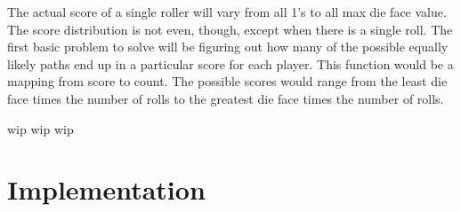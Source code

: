 \documentclass{article}
\begin{document}
The actual score of a single roller will vary from all 1's to all max die face value.  The score distribution is not even, though, except when there is a single roll.  The first basic problem to solve will be figuring out how many of the possible equally likely paths end up in a particular score for each player.  This function would be a mapping from score to count.  The possible scores would range from the least die face times the number of rolls to the greatest die face times the number of rolls.

wip wip wip 

\section*{Implementation}

\end{document}
